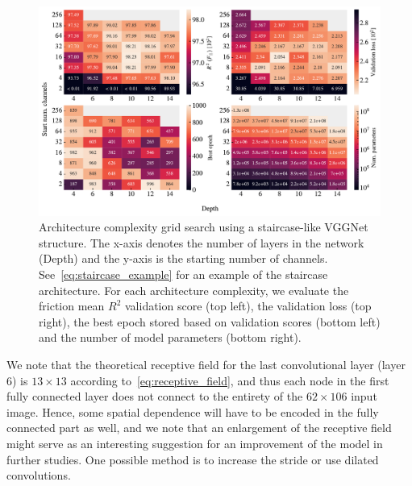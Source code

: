 \begin{figure}[!htb]
  \centering
  \includegraphics[width=\linewidth]{figures/ML/A_search_perf.pdf}
  \caption{Architecture complexity grid search using a staircase-like VGGNet structure. The x-axis denotes the number of layers in the network (Depth) and the y-axis is the starting number of channels. See~\cref{eq:staircase_example} for an example of the staircase architecture. For each architecture complexity, we evaluate the friction mean $R^2$ validation score (top left), the validation loss (top right), the best epoch stored based on validation scores (bottom left) and the number of model parameters (bottom right).}
  \label{fig:A_search_perf}
\end{figure}  


We note that the theoretical receptive field for the last
convolutional layer (layer 6) is $13 \times 13$ according to~\cref{eq:receptive_field}, and thus each node in the first fully connected
layer does not connect to the entirety of the $62\times106$ input image. Hence,
some spatial dependence will have to be encoded in the fully connected part as
well, and we note that an enlargement of the receptive field might serve as an interesting suggestion for an improvement of the model in further studies. One possible method is to increase the stride or use dilated convolutions.





